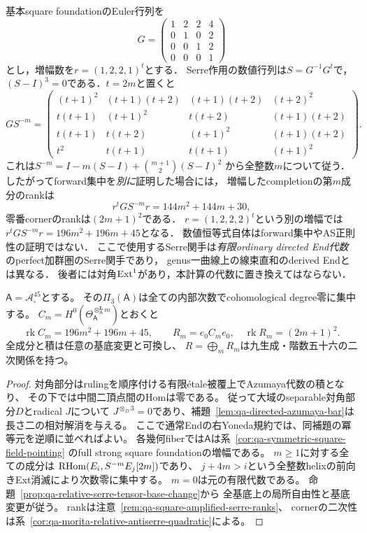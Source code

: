 \begin{remark}[square模型の全次数数値]
\label{rem:qa-square-amplified-serre-ranks}
基本square foundationのEuler行列を
\[
G=\begin{pmatrix}1&2&2&4\\0&1&0&2\\0&0&1&2\\0&0&0&1\end{pmatrix}
\]
とし，増幅数を$r=(1,2,2,1)^t$とする．
Serre作用の数値行列は$S=G^{-1}G^t$で，
$(S-I)^3=0$である．$t=2m$と置くと
\[
GS^{-m}=
\begin{pmatrix}
(t+1)^2&(t+1)(t+2)&(t+1)(t+2)&(t+2)^2\\
t(t+1)&(t+1)^2&t(t+2)&(t+1)(t+2)\\
t(t+1)&t(t+2)&(t+1)^2&(t+1)(t+2)\\
t^2&t(t+1)&t(t+1)&(t+1)^2
\end{pmatrix}.
\]
これは$S^{-m}=I-m(S-I)+\binom{m+1}{2}(S-I)^2$
から全整数$m$について従う．
したがってforward集中を\emph{別に}証明した場合には，
増幅したcompletionの第$m$成分のrankは
\[
r^tGS^{-m}r=144m^2+144m+30,
\]
零番cornerのrankは$(2m+1)^2$である．
$r=(1,2,2,2)^t$という別の増幅では
$r^tGS^{-m}r=196m^2+196m+45$となる．
数値恒等式自体はforward集中やAS正則性の証明ではない．
ここで使用するSerre関手は\emph{有限ordinary directed End代数}
のperfect加群圏のSerre関手であり，
genus一曲線上の線束直和のderived Endとは異なる．
後者には対角$\operatorname{Ext}^1$があり，本計算の代数に置き換えてはならない．
\end{remark}

\begin{corollary}[対称模型の全次数Serre代数]
\label{cor:qa-rank45-all-degree-serre}
$\mathsf A=\mathcal A_\square^{45}$とする。
その$\Pi_3(\mathsf A)$は全ての内部次数でcohomological degree零に集中する。
$C_m=H^0(\Theta_{\mathsf A}^{\otimes_{\mathsf A}^{\mathbf L}m})$とおくと
\[
 \operatorname{rk}C_m=196m^2+196m+45,\qquad
 R_m=e_0C_me_0,\quad \operatorname{rk}R_m=(2m+1)^2 .
\]
全成分と積は任意の基底変更と可換し、
$R=\bigoplus_m R_m$は九生成・階数五十六の二次関係を持つ。
\end{corollary}
\begin{proof}
対角部分はrulingを順序付ける有限\'etale被覆上でAzumaya代数の積となり、
その下では中間二頂点間のHomは零である。
従って大域のseparable対角部分$D$とradical $J$について
$J^{\otimes_D3}=0$であり、補題~\ref{lem:qa-directed-azumaya-bar}は
長さ二の相対解消を与える。
ここで通常Endの右Yoneda規約では、同補題の冪等元を逆順に並べればよい。
各幾何fiberでは$\mathsf A$は系~\ref{cor:qa-symmetric-square-field-pointing}
のfull strong square foundationの増幅である。
$m\ge1$に対する全ての成分は
$\operatorname{RHom}(E_i,S^{-m}E_j[2m])$であり、
$j+4m>i$という全整数helixの前向きExt消滅により次数零に集中する。
$m=0$は元の有限代数である。
命題~\ref{prop:qa-relative-serre-tensor-base-change}から
全基底上の局所自由性と基底変更が従う。
rankは注意~\ref{rem:qa-square-amplified-serre-ranks}、
cornerの二次性は系~\ref{cor:qa-morita-relative-antiserre-quadratic}による。
\end{proof}


